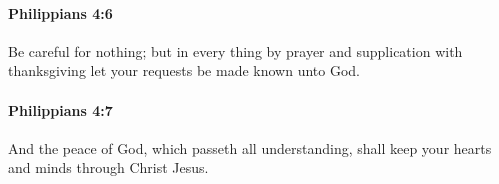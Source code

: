 		\paragraph{Philippians 4:6} %
			\label{PHILIPPIANS-4-6}

			Be careful for nothing; but in every thing by prayer and supplication with thanksgiving let your requests be made known unto God.

			\begin{framed}
			\scriptsize
				\begin{compactdesc}
					\item[SBLG] 
				\end{compactdesc}
			\end{framed}

		\paragraph{Philippians 4:7} %
			\label{PHILIPPIANS-4-7}

			And the peace of God, which passeth all understanding, shall keep your hearts and minds through Christ Jesus.

